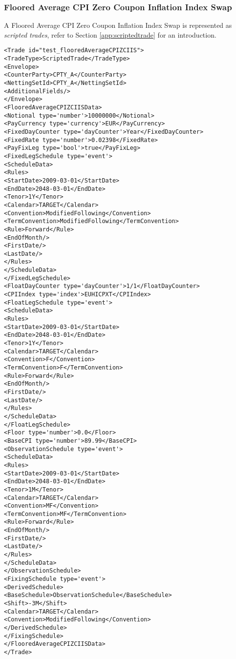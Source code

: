 \subsubsection{Floored Average CPI Zero Coupon Inflation Index Swap}
 
 
A Floored Average CPI Zero Coupon Inflation Index Swap is represented as {\em scripted trades}, refer to Section
\ref{app:scriptedtrade} for an introduction.
 
\begin{verbatim} 
<Trade id="test_flooredAverageCPIZCIIS">
<TradeType>ScriptedTrade</TradeType>
<Envelope>
<CounterParty>CPTY_A</CounterParty>
<NettingSetId>CPTY_A</NettingSetId>
<AdditionalFields/>
</Envelope>
<FlooredAverageCPIZCIISData>
<Notional type='number'>10000000</Notional>
<PayCurrency type='currency'>EUR</PayCurrency>
<FixedDayCounter type='dayCounter'>Year</FixedDayCounter>
<FixedRate type='number'>0.02398</FixedRate>
<PayFixLeg type='bool'>true</PayFixLeg>
<FixedLegSchedule type='event'>
<ScheduleData>
<Rules>
<StartDate>2009-03-01</StartDate>
<EndDate>2048-03-01</EndDate>
<Tenor>1Y</Tenor>
<Calendar>TARGET</Calendar>
<Convention>ModifiedFollowing</Convention>
<TermConvention>ModifiedFollowing</TermConvention>
<Rule>Forward</Rule>
<EndOfMonth/>
<FirstDate/>
<LastDate/>
</Rules>
</ScheduleData>
</FixedLegSchedule>
<FloatDayCounter type='dayCounter'>1/1</FloatDayCounter>
<CPIIndex type='index'>EUHICPXT</CPIIndex>
<FloatLegSchedule type='event'>
<ScheduleData>
<Rules>
<StartDate>2009-03-01</StartDate>
<EndDate>2048-03-01</EndDate>
<Tenor>1Y</Tenor>
<Calendar>TARGET</Calendar>
<Convention>F</Convention>
<TermConvention>F</TermConvention>
<Rule>Forward</Rule>
<EndOfMonth/>
<FirstDate/>
<LastDate/>
</Rules>
</ScheduleData>
</FloatLegSchedule>
<Floor type='number'>0.0</Floor>
<BaseCPI type='number'>89.99</BaseCPI>
<ObservationSchedule type='event'>
<ScheduleData>
<Rules>
<StartDate>2009-03-01</StartDate>
<EndDate>2048-03-01</EndDate>
<Tenor>1M</Tenor>
<Calendar>TARGET</Calendar>
<Convention>MF</Convention>
<TermConvention>MF</TermConvention>
<Rule>Forward</Rule>
<EndOfMonth/>
<FirstDate/>
<LastDate/>
</Rules>
</ScheduleData>
</ObservationSchedule>
<FixingSchedule type='event'>
<DerivedSchedule>
<BaseSchedule>ObservationSchedule</BaseSchedule>
<Shift>-3M</Shift>
<Calendar>TARGET</Calendar>
<Convention>ModifiedFollowing</Convention>
</DerivedSchedule>
</FixingSchedule>
</FlooredAverageCPIZCIISData>
</Trade>
\end{verbatim} 
 
